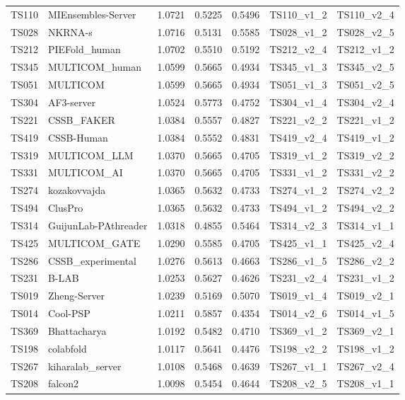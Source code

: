 \begin{table}[ht]
{\begin{tabular}{llrrrll}
TS110 & MIEnsembles-Server & 1.0721 & 0.5225 & 0.5496 & TS110\_v1\_2 & TS110\_v2\_4 \\ 
TS028 & NKRNA-s & 1.0716 & 0.5131 & 0.5585 & TS028\_v1\_2 & TS028\_v2\_5 \\ 
TS212 & PIEFold\_human & 1.0702 & 0.5510 & 0.5192 & TS212\_v2\_4 & TS212\_v1\_2 \\ 
TS345 & MULTICOM\_human & 1.0599 & 0.5665 & 0.4934 & TS345\_v1\_3 & TS345\_v2\_5 \\ 
TS051 & MULTICOM & 1.0599 & 0.5665 & 0.4934 & TS051\_v1\_3 & TS051\_v2\_5 \\ 
TS304 & AF3-server & 1.0524 & 0.5773 & 0.4752 & TS304\_v1\_4 & TS304\_v2\_4 \\ 
TS221 & CSSB\_FAKER & 1.0384 & 0.5557 & 0.4827 & TS221\_v2\_2 & TS221\_v1\_2 \\ 
TS419 & CSSB-Human & 1.0384 & 0.5552 & 0.4831 & TS419\_v2\_4 & TS419\_v1\_2 \\ 
TS319 & MULTICOM\_LLM & 1.0370 & 0.5665 & 0.4705 & TS319\_v1\_2 & TS319\_v2\_2 \\ 
TS331 & MULTICOM\_AI & 1.0370 & 0.5665 & 0.4705 & TS331\_v1\_2 & TS331\_v2\_2 \\ 
TS274 & kozakovvajda & 1.0365 & 0.5632 & 0.4733 & TS274\_v1\_2 & TS274\_v2\_2 \\ 
TS494 & ClusPro & 1.0365 & 0.5632 & 0.4733 & TS494\_v1\_2 & TS494\_v2\_2 \\ 
TS314 & GuijunLab-PAthreader & 1.0318 & 0.4855 & 0.5464 & TS314\_v2\_3 & TS314\_v1\_1 \\ 
TS425 & MULTICOM\_GATE & 1.0290 & 0.5585 & 0.4705 & TS425\_v1\_1 & TS425\_v2\_4 \\ 
TS286 & CSSB\_experimental & 1.0276 & 0.5613 & 0.4663 & TS286\_v1\_5 & TS286\_v2\_2 \\ 
TS231 & B-LAB & 1.0253 & 0.5627 & 0.4626 & TS231\_v2\_4 & TS231\_v1\_2 \\ 
TS019 & Zheng-Server & 1.0239 & 0.5169 & 0.5070 & TS019\_v1\_4 & TS019\_v2\_1 \\ 
TS014 & Cool-PSP & 1.0211 & 0.5857 & 0.4354 & TS014\_v2\_6 & TS014\_v1\_5 \\ 
TS369 & Bhattacharya & 1.0192 & 0.5482 & 0.4710 & TS369\_v1\_2 & TS369\_v2\_1 \\ 
TS198 & colabfold & 1.0117 & 0.5641 & 0.4476 & TS198\_v2\_2 & TS198\_v1\_2 \\ 
TS267 & kiharalab\_server & 1.0108 & 0.5468 & 0.4639 & TS267\_v1\_1 & TS267\_v2\_4 \\ 
TS208 & falcon2 & 1.0098 & 0.5454 & 0.4644 & TS208\_v2\_5 & TS208\_v1\_1 \\ 

\end{tabular}}
\end{table}
